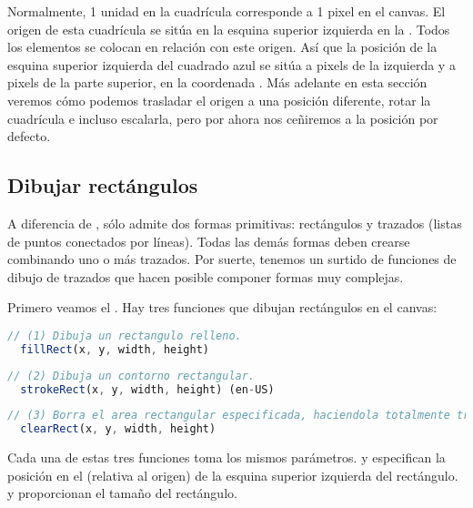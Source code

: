 Normalmente, 1 unidad en la cuadrícula corresponde a 1 pixel en el canvas. El origen de esta cuadrícula se sitúa en la esquina superior izquierda en la . Todos los elementos se colocan en relación con este origen. Así que la posición de la esquina superior izquierda del cuadrado azul se sitúa a  pixels de la izquierda y a  pixels de la parte superior, en la coordenada . Más adelante en esta sección veremos cómo podemos trasladar el origen a una posición diferente, rotar la cuadrícula e incluso escalarla, pero por ahora nos ceñiremos a la posición por defecto.

\subsection{Dibujar rectángulos}

A diferencia de ,  sólo admite dos formas primitivas: rectángulos y trazados (listas de puntos conectados por líneas). Todas las demás formas deben crearse combinando uno o más trazados. Por suerte, tenemos un surtido de funciones de dibujo de trazados que hacen posible componer formas muy complejas.

Primero veamos el . Hay tres funciones que dibujan rectángulos en el canvas:

\vspace{0.5cm} %
\begin{lstlisting}[language=TypeScript, style=mystyle]
  // (1) Dibuja un rectangulo relleno.
  fillRect(x, y, width, height)
\end{lstlisting}

\newpage %


\begin{lstlisting}[language=TypeScript, style=mystyle]
  // (2) Dibuja un contorno rectangular.
  strokeRect(x, y, width, height) (en-US)
\end{lstlisting}

\begin{lstlisting}[language=TypeScript, style=mystyle]
  // (3) Borra el area rectangular especificada, haciendola totalmente transparente.
  clearRect(x, y, width, height)
\end{lstlisting}
\vspace{0.5cm} %

Cada una de estas tres funciones toma los mismos parámetros.  y  especifican la posición en el  (relativa al origen) de la esquina superior izquierda del rectángulo.  y  proporcionan el tamaño del rectángulo.

